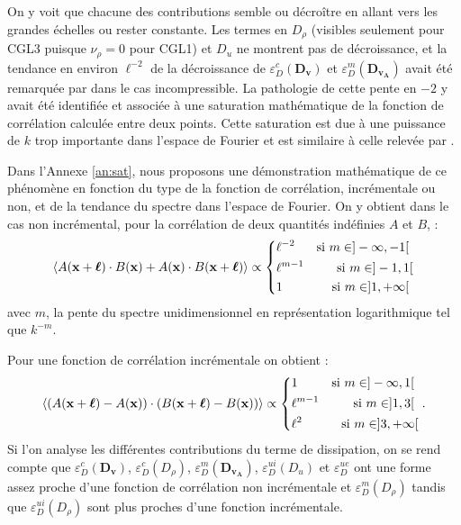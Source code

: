  On y voit que chacune des contributions semble ou décroître en allant vers les grandes échelles ou rester constante. Les termes en $D_{\rho}$ (visibles seulement pour CGL3 puisque $\nu_{\rho} = 0$ pour CGL1) et $D_u$ ne montrent pas de décroissance, et la tendance en environ $\ell^{-2}$ de la décroissance de $\varepsilon^{c}_{D}(\boldsymbol{D_{v}})$ et $\varepsilon^{m}_{D}(\boldsymbol{D_{v_A}})$ avait été remarquée par \cite{ferrand_multi-scale_2021} dans le cas incompressible. La pathologie de cette pente en $-2$ y avait été identifiée et associée à une saturation mathématique de la fonction de corrélation calculée entre deux points. Cette saturation est due à une puissance de $k$ trop importante dans l'espace de Fourier et est similaire à celle relevée par \cite{cho_simulations_2009}. 
 
 Dans l'Annexe \ref{an:sat}, nous proposons une démonstration mathématique de ce phénomène en fonction du type de la fonction de corrélation, incrémentale ou non, et de la tendance du spectre dans l'espace de Fourier. On y obtient dans le cas non incrémental, pour la corrélation de deux quantités indéfinies $A$ et $B$, : 
 \begin{eqnarray}
   \label{eq:sat_noninc}  \left<A({\bf x} + \boldsymbol{\ell})  \cdot B({\bf x}) + A({\bf x})  \cdot B({\bf x} + \boldsymbol{\ell})\right> 
 \propto \left\{
     \begin{aligned}
     &\ell^{-2}& \textrm{si $m \in ]-\infty,-1[$ } \\
  &\ell^{m-1}&  \textrm{si $m \in ]-1,1[$}  \\
  &1& \textrm{si $m \in ]1,+\infty[$ } 
 \end{aligned}
 \right.%
 \end{eqnarray}
 avec $m$, la pente du spectre unidimensionnel en représentation logarithmique tel que $k^{-m}$. 
 
 Pour une fonction de corrélation incrémentale on obtient :
 \begin{eqnarray}
    \label{eq:sat_inc} \left<(A({\bf x} + \boldsymbol{\ell}) - A({\bf x}))\cdot(B({\bf x} + \boldsymbol{\ell}) - B({\bf x})) \right> 
 \propto \left\{
     \begin{aligned}
     & 1 & \textrm{si $m \in ]-\infty,1[$ } \\
 & \ell^{m-1}&  \textrm{si $m \in ]1,3[$ }  \\
 & \ell^2 & \textrm{si $m \in ]3,+\infty[$}
 \end{aligned}
 \right. .%
 \end{eqnarray}
 Si l'on analyse les différentes contributions du terme de dissipation, on se rend compte que $ \varepsilon^{c}_{D}(\boldsymbol{D_{v}}) $, $ \varepsilon^{c}_{D}(D_{\rho})$, $\varepsilon^{m}_{D}(\boldsymbol{D_{v_A}}) $,
 $ \varepsilon^{ui}_{D}(D_u) $ et $\varepsilon^{ue}_{D}$ ont une forme assez proche d'une fonction de corrélation non incrémentale et $ \varepsilon^{m}_{D}(D_{\rho}) $ tandis que  $\varepsilon^{ui}_{D}(D_{\rho})$ sont plus proches d'une fonction incrémentale. 
 
